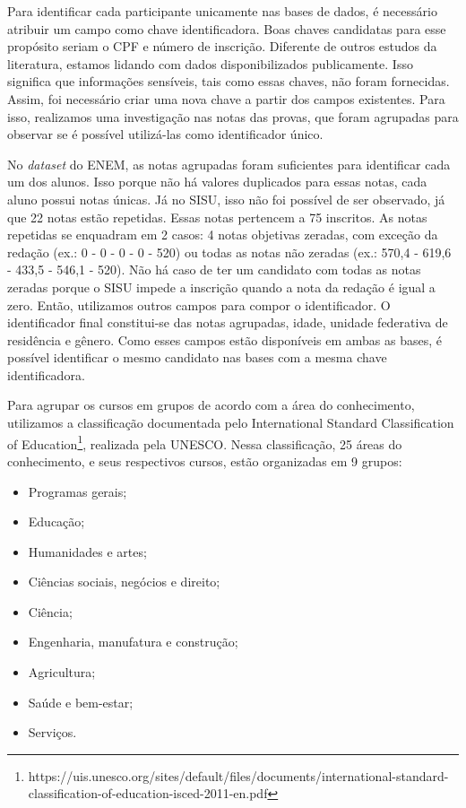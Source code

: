 Para identificar cada participante unicamente nas bases de dados, é necessário atribuir um campo como chave identificadora. Boas chaves candidatas para esse propósito seriam o CPF e número de inscrição. Diferente de outros estudos da literatura, estamos lidando com dados disponibilizados publicamente. Isso significa que informações sensíveis, tais como essas chaves, não foram fornecidas. Assim, foi necessário criar uma nova chave a partir dos campos existentes. 
Para isso, realizamos uma investigação nas notas das provas, que foram agrupadas 
para observar se é possível utilizá-las como identificador único. 

No \textit{dataset} do ENEM, as notas agrupadas foram suficientes para identificar cada um dos alunos. Isso porque não há valores duplicados para essas notas, cada aluno possui notas únicas. Já no SISU, isso não foi possível de ser observado, já que 22 notas estão repetidas. Essas notas pertencem a 75 inscritos. As notas repetidas se enquadram em 2 casos: 4 notas objetivas zeradas, com exceção da redação (ex.: 0 - 0 - 0 - 0 - 520) ou todas as notas não zeradas (ex.: 570,4 - 619,6 - 433,5 - 546,1 - 520). Não há caso de ter um candidato com todas as notas zeradas porque o SISU impede a inscrição quando a nota da redação é igual a zero. Então, utilizamos outros campos para compor o identificador. O identificador final constitui-se das notas agrupadas, idade, unidade federativa de residência e gênero. Como esses campos estão disponíveis em ambas as bases, é possível identificar o mesmo candidato nas bases com a mesma chave identificadora.

Para agrupar os cursos em grupos de acordo com a área do conhecimento, utilizamos a classificação documentada pelo International Standard Classification of Education\footnote{https://uis.unesco.org/sites/default/files/documents/international-standard-classification-of-education-isced-2011-en.pdf}, realizada pela UNESCO. Nessa classificação, 25 áreas do conhecimento, e seus respectivos cursos, estão organizadas em 9 grupos: 

\begin{itemize}
  \item Programas gerais;
  \item Educação;
  \item Humanidades e artes;
  \item Ciências sociais, negócios e direito;
  \item Ciência;
  \item Engenharia, manufatura e construção;
  \item Agricultura;
  \item Saúde e bem-estar;
  \item Serviços.
\end{itemize}


